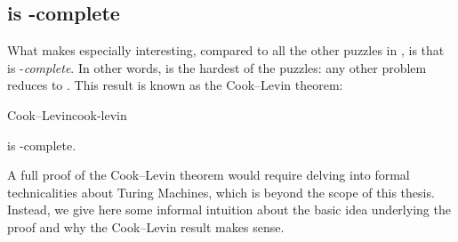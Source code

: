 






\subsection{\CircSat{} is \NP-complete}


What makes \CircSat{} especially interesting, compared to all the other puzzles
in \NP, is that \CircSat{} is \NP-\emph{complete}.  In other words, \CircSat{}
is the hardest of the \NP{} puzzles: any other \NP{} problem reduces to
\CircSat. This result is known as the Cook--Levin theorem:

\begin{theorem}{Cook--Levin}{cook-levin}

  \CircSat{} is \NP-complete.

\end{theorem}

A full proof of the Cook--Levin theorem would require delving into formal
technicalities about Turing Machines, which is beyond the scope of this thesis.
Instead, we give here some informal intuition about the basic idea underlying
the proof and why the Cook--Levin result makes sense.

